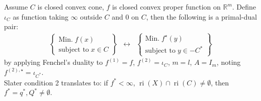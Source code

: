 \begin{coro}\label{coro:044-conic}
	Assume $C$ is closed convex cone, $f$ is closed convex proper function on $\mathbb{R}^m$. Define $\iota_C$ as function taking $\infty$ outside $C$ and $0$ on $C$, then the following is a primal-dual pair:
	\[
		\begin{matrix}
			\begin{Bmatrix}
				\text{Min.}\;    f(x) \\
				\text{subject to}\;  x\in C
			\end{Bmatrix} & \leftrightarrow &
			\begin{Bmatrix}
				\text{Min.}\;    f^\star(y) \\
				\text{subject to}\;    y\in -C^\ast
			\end{Bmatrix}
		\end{matrix}
	\]
	by applying Fenchel's duality to $f^{(1)}=f$, $f^{(2)}=\iota_C$, $m=l$, $A=I_m$, noting $f^{(2),\star}=\iota_{C^\ast}$.\\
	Slater condition 2 translates to: if $f^\ast<\infty$, $\operatorname{ri}(X)\cap \operatorname{ri}(C)\neq\emptyset$, then $f^\ast=q^\ast,Q^\ast\neq\emptyset$.
\end{coro}

